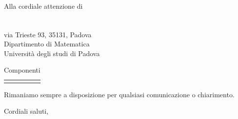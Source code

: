 \documentclass[a4paper]{letter}
\begin{document}
\begin{letter} {Alla cordiale attenzione di \\ \TV \\ \RC \\ via Trieste 93, 35131, Padova\\ Dipartimento di Matematica \\ Università degli studi di Padova }
\begin{longtable}{
			>{\centering}p{}
			>{\centering}p{}
			>{\centering\arraybackslash}p{} }
			\rowcolor{white}\caption {Componenti} \\

		\end{longtable}
	Rimaniamo sempre a disposizione per qualsiasi comunicazione o chiarimento.\\

\closing{
  Cordiali saluti,
}

\end{letter}
\end{document}
